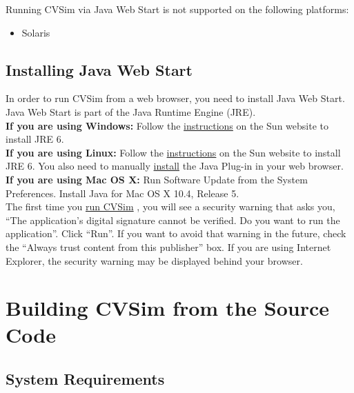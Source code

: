 \documentclass[12pt]{article}
\begin{document}
\noindent Running CVSim via Java Web Start is not supported on the following platforms:
\begin{itemize}
\item Solaris
\end{itemize}

\subsection{Installing Java Web Start}
In order to run CVSim from a web browser, you need to
install Java Web Start. Java Web Start is part of the Java Runtime
Engine (JRE). \\

\noindent \textbf{If you are using Windows:} Follow the \href{http://java.sun.com/javase/6/webnotes/install/index.html}{instructions}
on the Sun website to install JRE 6.\\

\noindent \textbf{If you are using Linux:} Follow the \href{http://java.sun.com/javase/6/webnotes/install/index.html}{instructions} on the Sun
website to install JRE 6. You also need to manually 
\href{http://java.sun.com/javase/6/webnotes/install/jre/manual-plugin-install-linux.html}{install} the Java
Plug-in in your web browser.\\

\noindent \textbf{If you are using Mac OS X:} Run Software Update from the System
Preferences. Install Java for Mac OS X 10.4, Release 5.\\

\noindent The first time you 
\href{http://physionet.org/physiotools/cvsim/cvsim_deploy.jnlp}{run CVSim}
, you will see a security warning that
asks you, ``The application's digital signature cannot be verified. Do
you want to run the application''. Click ``Run''. If you want to avoid
that warning in the future, check the ``Always trust content from this
publisher'' box. If you are using Internet Explorer, the security
warning may be displayed behind your browser.



\section{Building CVSim from the Source Code}

\subsection{System Requirements}
\end{document}
